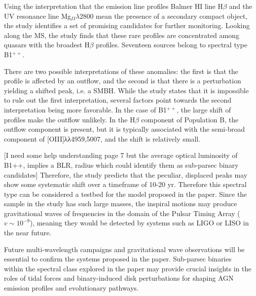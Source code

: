 \documentclass[12pt]{article}
\begin{document}
Using the interpretation that the emission line profiles Balmer HI line H$\beta$ and the UV resonance line Mg$_{II} \lambda 2800$ mean the presence of a secondary compact object, the study identifies a set of promising candidates for further monitoring. Looking along the MS, the study finds that these rare profiles are concentrated among quasars with the broadest H$\beta$ profiles. Seventeen sources belong to spectral type B1$^{++}$. 

There are two possible interpretations of these anomalies: the first is that the profile is affected by an outflow, and the second is that there is a perturbation yielding a shifted peak, i.e. a SMBH. While the study states that it is impossible to rule out the first interpretation, several factors point towards the second interpretation being more favorable. In the case of B1$^{++}$, the large shift of profiles make the outflow unlikely. In the H$\beta$ component of Population B, the outflow component is present, but it is typically associated with the semi-broad component of [OIII]λλ4959,5007, and the shift is relatively small. 

[I need some help understanding page 7 but the average optical luminosity of B1++, implies a BLR, radius which could identify them as sub-parsec binary candidates]
Therefore, the study predicts that the peculiar, displaced peaks may show some systematic shift over a timeframe of 10-20 yr. Therefore this spectral type can be considered a testbed for the model proposed in the paper. 
Since the sample in the study has such large masses, the inspiral motions may produce gravitational waves of frequencies in the domain of the Pulsar Timing Array ($v \sim 10^{-9}$), meaning they would be detected by systems such as LIGO or LISO in the near future. 

Future multi-wavelength campaigns and gravitational wave observations will be essential to confirm the systems proposed in the paper. Sub-parsec binaries within the spectral class explored in the paper may provide crucial insights in the roles of tidal forces and binary-induced disk perturbations for shaping AGN emission profiles and evolutionary pathways. 


\pagebreak

\printbibliography
\end{document}
